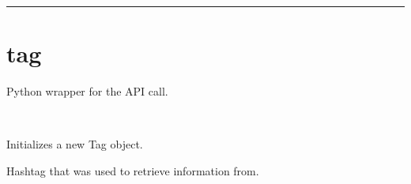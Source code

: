 \documentclass[letterpaper,10pt,english,openany,oneside]{sphinxmanual}
\begin{document}
\bigskip\hrule\bigskip



\section{tag}
\label{\detokenize{source/wrapper/tag:tag}}\label{\detokenize{source/wrapper/tag::doc}}
\begin{sphinxVerbatim}[commandchars=\\\{\}]
   
\end{sphinxVerbatim}

Python wrapper for the  API call.

\begin{fulllineitems}
\label{\detokenize{source/wrapper/tag:Tag}}~

\begin{fulllineitems}
\label{\detokenize{source/wrapper/tag:instahashtag.wrapper.Tag.Tag.__init__}}
Initializes a new Tag object.

\begin{sphinxVerbatim}[commandchars=\\\{\}]
   

  
\end{sphinxVerbatim}

\begin{fulllineitems}
\label{\detokenize{source/wrapper/tag:instahashtag.wrapper.Tag.Tag.hashtag}}
Hashtag that was used to retrieve information from.

\begin{sphinxVerbatim}[commandchars=\\\{\}]
 
\end{sphinxVerbatim}


\end{fulllineitems}
\end{fulllineitems}
\end{fulllineitems}
\end{document}
